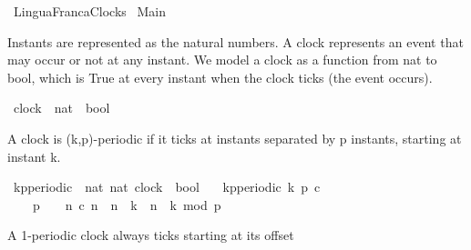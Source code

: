 %
\begin{isabellebody}%
%
%
\isadelimtheory
%
\endisadelimtheory
%
\isatagtheory
{}\isamarkupfalse%
\ LinguaFrancaClocks\isanewline
\isanewline
\isanewline
{}\ Main\isanewline
\isanewline
{}%
\endisatagtheory
{\isafoldtheory}%
%
\isadelimtheory
%
\endisadelimtheory
%
\isadelimdocument
%
\endisadelimdocument
%
\isatagdocument
%
\isamarkuptrue%
%
\endisatagdocument
{\isafolddocument}%
%
\isadelimdocument
%
\endisadelimdocument
%
\begin{isamarkuptext}%
Instants are represented as the natural numbers.
A clock represents an event that may occur or not at any instant.
We model a clock as a function from nat to bool, which is True at every
instant when the clock ticks (the event occurs).%
\end{isamarkuptext}\isamarkuptrue%
\isamarkupfalse%
\ clock\ {\isacharequal}\ {\isacartoucheopen}nat\ {\isasymRightarrow}\ bool{\isacartoucheclose}%
\isadelimdocument
%
\endisadelimdocument
%
\isatagdocument
%
\isamarkuptrue%
%
\endisatagdocument
{\isafolddocument}%
%
\isadelimdocument
%
\endisadelimdocument
%
\begin{isamarkuptext}%
A clock is (k,p)-periodic if it ticks at instants separated by p instants,
starting at instant k.%
\end{isamarkuptext}\isamarkuptrue%
\isamarkupfalse%
\ kp{\isacharunderscore}periodic\ {\isacharcolon}{\isacharcolon}\ {\isacartoucheopen}{\isacharbrackleft}nat{\isacharcomma}\ nat{\isacharcomma}\ clock{\isacharbrackright}\ {\isasymRightarrow}\ bool{\isacartoucheclose}\isanewline
\ \ \ {\isacartoucheopen}kp{\isacharunderscore}periodic\ k\ p\ c\ {\isasymequiv}\isanewline
\ \ \ \ {\isacharparenleft}p\ {\isachargreater}\ {}{\isacharparenright}\ {\isasymand}\ {\isacharparenleft}{\isasymforall}n{\isachardot}\ c\ n\ {\isacharequal}\ {\isacharparenleft}{\isacharparenleft}n\ {\isasymge}\ k{\isacharparenright}\ {\isasymand}\ {\isacharparenleft}{\isacharparenleft}n\ {\isacharminus}\ k{\isacharparenright}\ mod\ p\ {\isacharequal}\ {}{\isacharparenright}{\isacharparenright}{\isacharparenright}{\isacartoucheclose}%
\begin{isamarkuptext}%
A 1-periodic clock always ticks starting at its offset%
\end{isamarkuptext}\isamarkuptrue%

\end{isabellebody}
